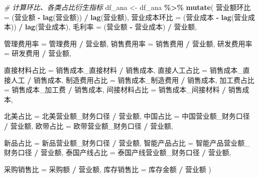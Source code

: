 \documentclass[
]{article}
\newenvironment{Shaded}{\begin{snugshade}}{\end{snugshade}}
\newcommand{\CommentTok}[1]{\textcolor[rgb]{0.56,0.35,0.01}{\textit{#1}}}
\newcommand{\FunctionTok}[1]{\textcolor[rgb]{0.13,0.29,0.53}{\textbf{#1}}}
\newcommand{\NormalTok}[1]{#1}
\newcommand{\OtherTok}[1]{\textcolor[rgb]{0.56,0.35,0.01}{#1}}
\newcommand{\SpecialCharTok}[1]{\textcolor[rgb]{0.81,0.36,0.00}{\textbf{#1}}}
\begin{document}
\begin{Shaded}
\begin{Highlighting}[]
\CommentTok{\# 计算环比、各类占比衍生指标}
\NormalTok{df\_ana }\OtherTok{\textless{}{-}}\NormalTok{ df\_ana }\SpecialCharTok{\%\textgreater{}\%}
  \FunctionTok{mutate}\NormalTok{(}
\NormalTok{    营业额环比 }\OtherTok{=}\NormalTok{ (营业额 }\SpecialCharTok{{-}} \FunctionTok{lag}\NormalTok{(营业额)) }\SpecialCharTok{/} \FunctionTok{lag}\NormalTok{(营业额),}
\NormalTok{    营业成本环比 }\OtherTok{=}\NormalTok{ (营业成本 }\SpecialCharTok{{-}} \FunctionTok{lag}\NormalTok{(营业成本)) }\SpecialCharTok{/} \FunctionTok{lag}\NormalTok{(营业成本),}
\NormalTok{    毛利率 }\OtherTok{=}\NormalTok{ (营业额 }\SpecialCharTok{{-}}\NormalTok{ 营业成本) }\SpecialCharTok{/}\NormalTok{ 营业额,}
    
\NormalTok{    管理费用率 }\OtherTok{=}\NormalTok{ 管理费用 }\SpecialCharTok{/}\NormalTok{ 营业额,}
\NormalTok{    销售费用率 }\OtherTok{=}\NormalTok{ 销售费用 }\SpecialCharTok{/}\NormalTok{ 营业额,}
\NormalTok{    研发费用率 }\OtherTok{=}\NormalTok{ 研发费用 }\SpecialCharTok{/}\NormalTok{ 营业额,}
    
\NormalTok{    直接材料占比 }\OtherTok{=}\NormalTok{ 销售成本\_直接材料 }\SpecialCharTok{/}\NormalTok{ 销售成本,}
\NormalTok{    直接人工占比 }\OtherTok{=}\NormalTok{ 销售成本\_直接人工 }\SpecialCharTok{/}\NormalTok{ 销售成本,}
\NormalTok{    制造费用占比 }\OtherTok{=}\NormalTok{ 销售成本\_制造费用 }\SpecialCharTok{/}\NormalTok{ 销售成本,}
\NormalTok{    加工费占比 }\OtherTok{=}\NormalTok{ 销售成本\_加工费 }\SpecialCharTok{/}\NormalTok{ 销售成本,}
\NormalTok{    间接材料占比 }\OtherTok{=}\NormalTok{ 销售成本\_间接材料 }\SpecialCharTok{/}\NormalTok{ 销售成本,}
    
\NormalTok{    北美占比 }\OtherTok{=}\NormalTok{ 北美营业额\_财务口径 }\SpecialCharTok{/}\NormalTok{ 营业额,}
\NormalTok{    中国占比 }\OtherTok{=}\NormalTok{ 中国营业额\_财务口径 }\SpecialCharTok{/}\NormalTok{ 营业额,}
\NormalTok{    欧带占比 }\OtherTok{=}\NormalTok{ 欧带营业额\_财务口径 }\SpecialCharTok{/}\NormalTok{ 营业额,}
    
\NormalTok{    新品占比 }\OtherTok{=}\NormalTok{ 新品营业额\_财务口径 }\SpecialCharTok{/}\NormalTok{ 营业额,}
\NormalTok{    智能产品占比 }\OtherTok{=}\NormalTok{ 智能产品营业额\_财务口径 }\SpecialCharTok{/}\NormalTok{ 营业额,}
\NormalTok{    泰国产线占比 }\OtherTok{=}\NormalTok{ 泰国产线营业额\_财务口径 }\SpecialCharTok{/}\NormalTok{ 营业额,}
    
\NormalTok{    采购销售比 }\OtherTok{=}\NormalTok{ 采购额 }\SpecialCharTok{/}\NormalTok{ 营业额,}
\NormalTok{    库存销售比 }\OtherTok{=}\NormalTok{ 库存金额 }\SpecialCharTok{/}\NormalTok{ 营业额}
\NormalTok{  )}
\end{Highlighting}
\end{Shaded}
\end{document}
